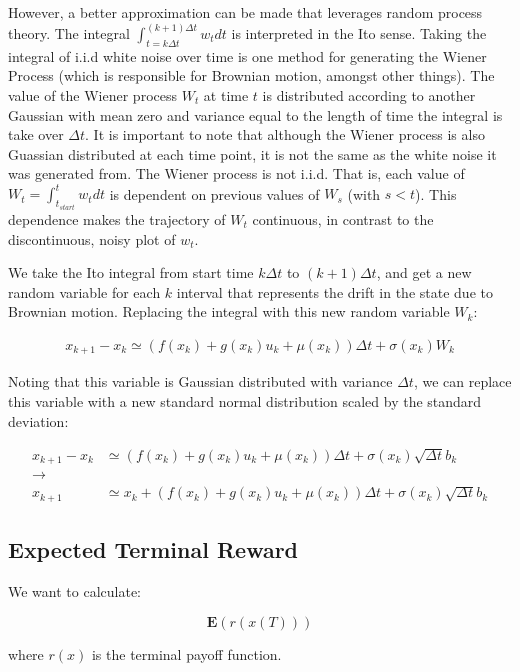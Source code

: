 \documentclass[a4paper]{article}
\begin{document}
However, a better approximation can be made that leverages random process theory.
The integral $\int_{t = k \Delta t}^{(k+1) \Delta t} w_t dt$ is interpreted in the Ito sense.
Taking the integral of i.i.d white noise over time is one method for generating the Wiener Process (which is responsible for Brownian motion, amongst other things).
The value of the Wiener process $W_t$ at time $t$ is distributed according to another Gaussian with mean zero and variance equal to the length of time the integral is take over $\Delta t$.
It is important to note that although the Wiener process is also Guassian distributed at each time point, it is not the same as the white noise it was generated from.
The Wiener process is not i.i.d.
That is, each value of $W_t = \int_{t_{start}}^{t} w_t dt$ is dependent on previous values of $W_s$ (with $s<t$).
This dependence makes the trajectory of $W_t$ continuous, in contrast to the discontinuous, noisy plot of $w_t$.

We take the Ito integral from start time $k \Delta t$ to $(k+1) \Delta t$, and get a new random variable for each $k$ interval that represents the drift in the state due to Brownian motion.
Replacing the integral with this new random variable $W_k$:

\begin{align*}
x_{k+1} - x_k \simeq (f(x_k) + g(x_k) u_k + \mu(x_k)) \Delta t + \sigma(x_k) W_k
\end{align*}

Noting that this variable is Gaussian distributed with variance $\Delta t$, we can replace this variable with a new standard normal distribution scaled by the standard deviation:

\begin{align*}
x_{k+1} - x_k &\simeq (f(x_k) + g(x_k) u_k + \mu(x_k)) \Delta t + \sigma(x_k) \sqrt{\Delta t} b_k
\\ \rightarrow &
\\x_{k+1} &\simeq x_k + (f(x_k) + g(x_k) u_k + \mu(x_k)) \Delta t + \sigma(x_k) \sqrt{\Delta t} b_k
\label{eq:DistochDyn}
\end{align*}

\subsection{Expected Terminal Reward}
We want to calculate:

$$
\mathbf{E}(r(x(T)))
$$

where $r(x)$ is the terminal payoff function.
\end{document}
